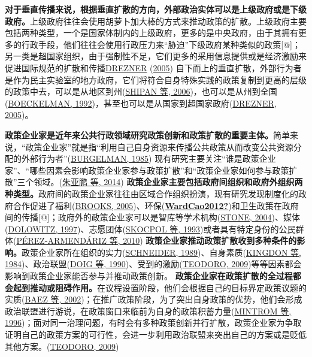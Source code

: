 \documentclass[
  12pt,
]{ctexart}
\begin{document}
\textbf{对于垂直传播来说，根据垂直扩散的方向，外部政治实体可以是上级政府或是下级政府。}上级政府往往会使用胡萝卜加大棒的方式来推动政策的扩散。上级政府主要包括两种类型，一个是国家体制内的上级政府，更多的是中央政府，由于其拥有更多的行政手段，他们往往会使用行政压力来``胁迫''下级政府某种类似的政策{[}@{]}；另一类是超国家组织，由于强制性不足，它们更多的采用信息提供或是经济激励来促进国际规范的扩散和传播\protect\hyperlink{ref-Drezner2005}{DREZNER} (\protect\hyperlink{ref-Drezner2005}{2005})
自下而上的垂直扩散，外部行为者是作为民主实验室的地方政府，它们将符合自身特殊实践的政策复制到更高的层级的政策中去，可以是从地区到州(\protect\hyperlink{ref-ShipanVolden2006}{SHIPAN 等, 2006})，也可以是从州到全国(\protect\hyperlink{ref-Boeckelman1992}{BOECKELMAN, 1992})，甚至也可以是从国家到超国家政府(\protect\hyperlink{ref-Drezner2005}{DREZNER, 2005})。

\textbf{政策企业家是近年来公共行政领域研究政策创新和政策扩散的重要主体。}简单来说，``政策企业家''就是指``利用自己自身资源来传播公共政策从而改变公共资源分配的外部行为者''(\protect\hyperlink{ref-Burgelman1985}{BURGELMAN, 1985})
现有研究主要关注``谁是政策企业家''、``哪些因素会影响政策企业家参与政策扩散''和``政策企业家如何参与政策扩散''三个领域。(\protect\hyperlink{ref-ZhuYaPengXiaoDiWen2014}{朱亚鹏 等, 2014})
\textbf{政策企业家主要包括政府间组织和政府外组织两种类型。}政府间的政策企业家往往由区域合作组织扮演，现有研究发现制度化的政府合作促进了福利(\protect\hyperlink{ref-Brooks2005}{BROOKS, 2005})、环保(\protect\hyperlink{ref-WardCao2012}{\textbf{WardCao2012?}})和卫生政策在政府间的传播{[}@{]}；政府外的政策企业家可以是智库等学术机构(\protect\hyperlink{ref-Stone2004}{STONE, 2004})、媒体(\protect\hyperlink{ref-Dolowitz1997}{DOLOWITZ, 1997})、志愿团体(\protect\hyperlink{ref-SkocpolEtAl1993}{SKOCPOL 等, 1993})或者具有特定身份的公民群体(\protect\hyperlink{ref-Perez-ArmendarizCrow2010}{PÉREZ-ARMENDÁRIZ 等, 2010})
\textbf{政策企业家推动政策扩散收到多种条件的影响。}政策企业家所在组织的实力(\protect\hyperlink{ref-Schneider1989}{SCHNEIDER, 1989})、自身素质(\protect\hyperlink{ref-KingdonStano1984a}{KINGDON 等, 1984})、政治联盟(\protect\hyperlink{ref-DoigHargrove1990}{DOIG 等, 1990})、受到的激励(\protect\hyperlink{ref-Teodoro2009}{TEODORO, 2009})等等因素都会影响到政策企业家能否参与并推动政策创新。
\textbf{政策企业家在政策扩散的全过程都会起到推动或阻碍作用。}在议程设置阶段，他们会根据自己的目标界定政策议题的实质(\protect\hyperlink{ref-BaezAbolafia2002}{BAEZ 等, 2002})；在推广政策阶段，为了突出自身政策的优势，他们会形成政治联盟进行游说，在政策窗口来临前为自身的政策积蓄力量(\protect\hyperlink{ref-MintromVergari1996}{MINTROM 等, 1996})；面对同一治理问题，有时会有多种政策创新并行扩散，政策企业家为争取证明自己的政策方案的可行性，会进一步利用政治联盟来突出自己的方案或是贬低其他方案。(\protect\hyperlink{ref-Teodoro2009}{TEODORO, 2009})
\end{document}
